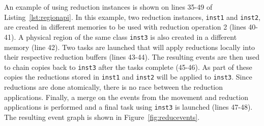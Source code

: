 An example of using reduction instances is shown on lines 35-49 of Listing~\ref{lst:regionapi}.
In this example, two reduction instances, {\tt inst1} and {\tt inst2}, are created in different memories to
be used with reduction operation 2 (lines 40-41).  A physical region of the same class {\tt inst3}
is also created in a different memory (line 42).  Two tasks are launched that will apply
reductions locally into their respective reduction buffers (lines 43-44).  The resulting
events are then used to chain copies back to {\tt inst3} after the tasks complete (45-46).  As
part of these copies the reductions stored in {\tt inst1} and {\tt inst2} will be applied
to {\tt inst3}.  Since reductions are done atomically, there is no race between the reduction
applications.  Finally, a merge on the events from the movement and reduction applications is 
performed and a final task using {\tt inst3} is launched (lines 47-48).  The resulting event
graph is shown in Figure~\ref{fig:reducevents}.



